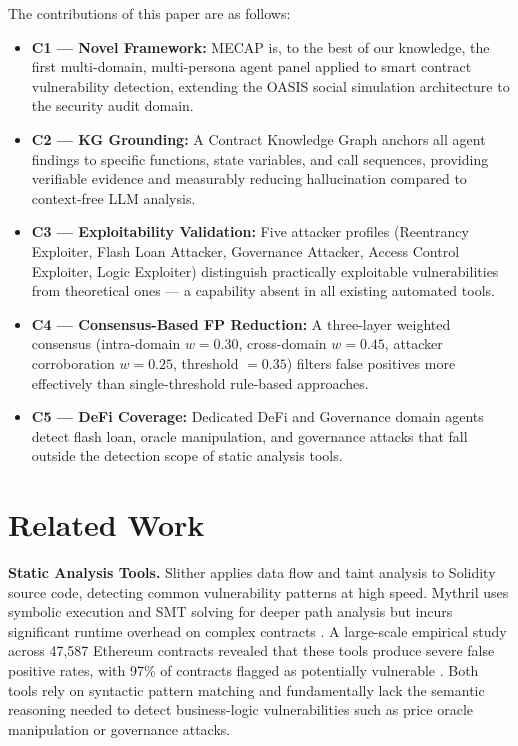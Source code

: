 \documentclass[10pt, conference, a4paper, compsocconf]{IEEEtran}
\begin{document}
The contributions of this paper are as follows:
\begin{itemize}
  \item \textbf{C1 --- Novel Framework:} MECAP is, to the best of our knowledge, the first multi-domain, multi-persona agent panel applied to smart contract vulnerability detection, extending the OASIS social simulation architecture \cite{yang2024oasis} to the security audit domain.
  \item \textbf{C2 --- KG Grounding:} A Contract Knowledge Graph anchors all agent findings to specific functions, state variables, and call sequences, providing verifiable evidence and measurably reducing hallucination compared to context-free LLM analysis.
  \item \textbf{C3 --- Exploitability Validation:} Five attacker profiles (Reentrancy Exploiter, Flash Loan Attacker, Governance Attacker, Access Control Exploiter, Logic Exploiter) distinguish practically exploitable vulnerabilities from theoretical ones --- a capability absent in all existing automated tools.
  \item \textbf{C4 --- Consensus-Based FP Reduction:} A three-layer weighted consensus (intra-domain $w{=}0.30$, cross-domain $w{=}0.45$, attacker corroboration $w{=}0.25$, threshold $=0.35$) filters false positives more effectively than single-threshold rule-based approaches.
  \item \textbf{C5 --- DeFi Coverage:} Dedicated DeFi and Governance domain agents detect flash loan, oracle manipulation, and governance attacks that fall outside the detection scope of static analysis tools.
\end{itemize}

\section{Related Work}

\textbf{Static Analysis Tools.}
Slither \cite{feist2019slither} applies data flow and taint analysis to Solidity source code, detecting common vulnerability patterns at high speed. Mythril \cite{mythril} uses symbolic execution and SMT solving for deeper path analysis but incurs significant runtime overhead on complex contracts \cite{ghaleb2020effective}. A large-scale empirical study across 47,587 Ethereum contracts revealed that these tools produce severe false positive rates, with 97\% of contracts flagged as potentially vulnerable \cite{durieux2020empirical}. Both tools rely on syntactic pattern matching and fundamentally lack the semantic reasoning needed to detect business-logic vulnerabilities such as price oracle manipulation or governance attacks.
\end{document}
